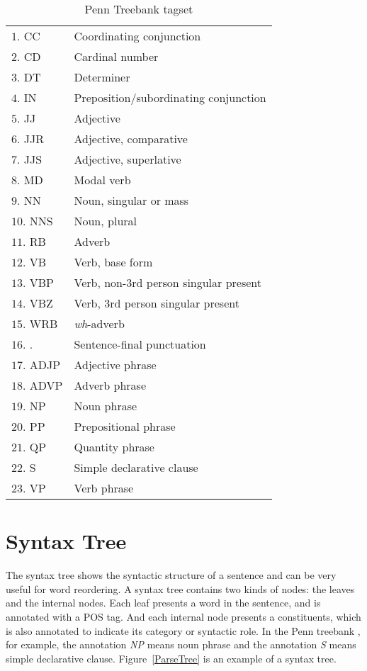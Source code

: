 \begin{table}
\centering
\begin{tabular}{|p{4.5cm}l|}
\hline
$1$. \hphantom{1}CC &  Coordinating conjunction\\
$2$.  \hphantom{1}CD &  Cardinal number\\
$3$. \hphantom{1}DT &  Determiner\\
$4$. \hphantom{1}IN &  Preposition/subordinating conjunction\\
$5$. \hphantom{1}JJ &  Adjective\\
$6$. \hphantom{1}JJR &   Adjective, comparative\\
$7$. \hphantom{1}JJS &   Adjective, superlative\\
$8$. \hphantom{1}MD &  Modal verb\\
$9$. \hphantom{1}NN &  Noun, singular or mass\\
$10$. NNS &   Noun, plural\\
$11$. RB &  Adverb\\
$12$. VB &  Verb, base form\\
$13$. VBP &   Verb, non-$3$rd person singular present\\
$14$. VBZ &   Verb, $3$rd person singular present\\
$15$. WRB &   \emph{wh}-adverb\\
$16$. . &   Sentence-final punctuation\\
$17$. ADJP &  Adjective phrase\\
$18$. ADVP &  Adverb phrase\\
$19$. NP &  Noun phrase\\
$20$. PP &  Prepositional phrase\\
$21$. QP &  Quantity phrase\\
$22$. S &  Simple declarative clause\\
$23$. VP &  Verb phrase \\ \hline
\end{tabular}
\caption{Penn Treebank tagset}
\label{ttags}
\end{table}
\label{ch:Foundations:sec:PosTag}

\section{Syntax Tree}
\label{ch:Foundations:sec:SyntacticTree}

The syntax tree shows the syntactic structure of a sentence and can be very useful for word reordering. A syntax tree contains two kinds of nodes: the leaves and the internal nodes. Each leaf presents a word in the sentence, and is annotated with a POS tag. And each internal node presents a constituents, which is also annotated to indicate its category or syntactic role. In the Penn treebank \citep{penn, penn3}, for example, the annotation \emph{NP} means noun phrase and the annotation \emph{S} means simple declarative clause. Figure~\ref{ParseTree} is an example of a syntax tree.


